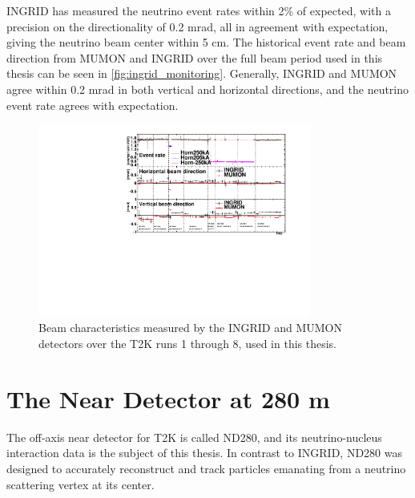 INGRID has measured the neutrino event rates within 2\% of expected, with a precision on the directionality of 0.2 mrad, all in agreement with expectation\cite{t2k_2015}, giving the neutrino beam center within 5 cm. The historical event rate and beam direction from MUMON and INGRID over the full beam period used in this thesis can be seen in \autoref{fig:ingrid_monitoring}. Generally, INGRID and MUMON agree within 0.2 mrad in both vertical and horizontal directions, and the neutrino event rate agrees with expectation.
\begin{figure}[h]
	\includegraphics[width=0.8\textwidth, trim={0mm 0mm 0mm 0mm}, clip,page=1]{figures/det_chap/ingrid/INGRID_official_plot_until74}
	\caption{Beam characteristics measured by the INGRID and MUMON detectors over the T2K runs 1 through 8, used in this thesis.}
	\label{fig:ingrid_monitoring}
\end{figure}

\section{The Near Detector at 280 m}
\label{sec:nd280}
The off-axis near detector for T2K is called ND280, and its neutrino-nucleus interaction data is the subject of this thesis. In contrast to INGRID, ND280 was designed to accurately reconstruct and track particles emanating from a neutrino scattering vertex at its center.

